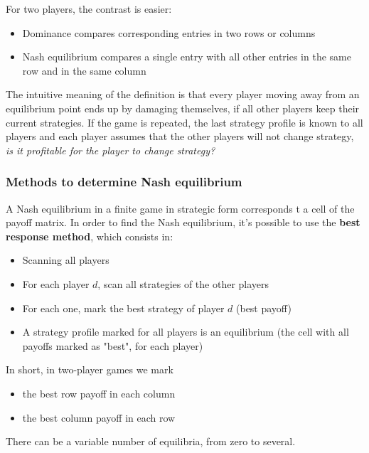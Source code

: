 For two players, the contrast is easier: 
\begin{itemize}
	\item Dominance compares corresponding entries in two rows or columns
	
	\item Nash equilibrium compares a single entry with all other entries in the same row and in the same column
\end{itemize}

The intuitive meaning of the definition is that every player moving away from an equilibrium point ends up by damaging themselves, if all other players keep their current strategies. If the game is repeated, the last strategy profile is known to all players and each player assumes that the other players will not change strategy, \textit{is it profitable for the player to change strategy?}

\subsubsection{Methods to determine Nash equilibrium}

A Nash equilibrium in a finite game in strategic form corresponds t a cell of the payoff matrix. In order to find the Nash equilibrium, it's possible to use the \textbf{best response method}, which consists in:
\begin{itemize}
	\item Scanning all players 
	
	\item For each player $d$, scan all strategies of the other players 
	
	\item For each one, mark the best strategy of player $d$ (best payoff)
	
	\item A strategy profile marked for all players is an equilibrium (the cell with all payoffs marked as "best", for each player)
\end{itemize}

In short, in two-player games we mark
\begin{itemize}
	\item the best row payoff in each column
	
	\item the best column payoff in each row
\end{itemize}

There can be a variable number of equilibria, from zero to several.

